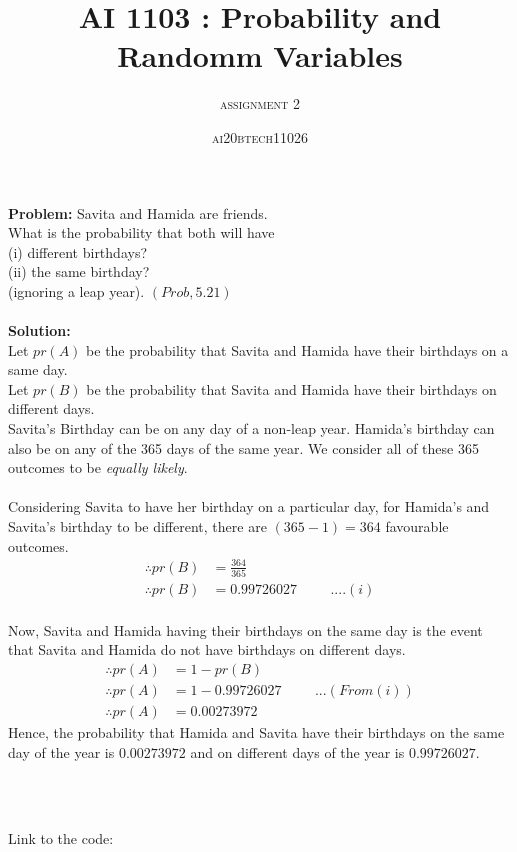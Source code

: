 \documentclass{article}
\title{\textbf{AI 1103 : Probability and Randomm Variables}}
\author{\textsc{assignment 2}}
\date{\textsc{ai20btech11026}}
\begin{document}
\maketitle
\noindent
\textbf{\large{Problem:}}
Savita and Hamida are friends.\\ What is the probability that both will have\\ (i) different birthdays?\\ (ii) the same birthday?\\ (ignoring a leap year). \hspace{0.6in}\((Prob,5.21)\)
\\\\\textbf{\large{Solution:}}
\\\indent
Let \(pr(A)\) be the probability that Savita and Hamida have their birthdays on a same day.
\\\indent Let \(pr(B)\) be the probability that Savita and Hamida have their birthdays on different days.
\\Savita's Birthday can be on any day of a non-leap year. Hamida's birthday can also be on any of the 365 days of the same year. We consider all of these 365 outcomes to be \textit{equally likely}.
\\\\
Considering Savita to have her birthday on a particular day,
for Hamida's and Savita's birthday to be different, there are \((365 - 1) = 364\) favourable outcomes.
\begin{align*}
    \therefore pr(B) &= \frac{364}{365}\\
    \therefore pr(B) &= 0.99726027 \hspace{1cm}....(i)
\end{align*}
\\Now, Savita and Hamida having their birthdays on the same day is the event that Savita and Hamida do not have birthdays on different days.
\begin{align*}
    \therefore pr(A) &= 1 - pr(B) \\
    \therefore pr(A) &= 1 - 0.99726027 \hspace{1cm}...(From(i))\\
    \therefore pr(A) &= 0.00273972
\end{align*}
\indent Hence, the probability that Hamida and Savita have their birthdays on the same day of the year is $0.00273972$ and on different days of the year is $0.99726027$.

\\\\{Link to the code:

}
\end{document}
